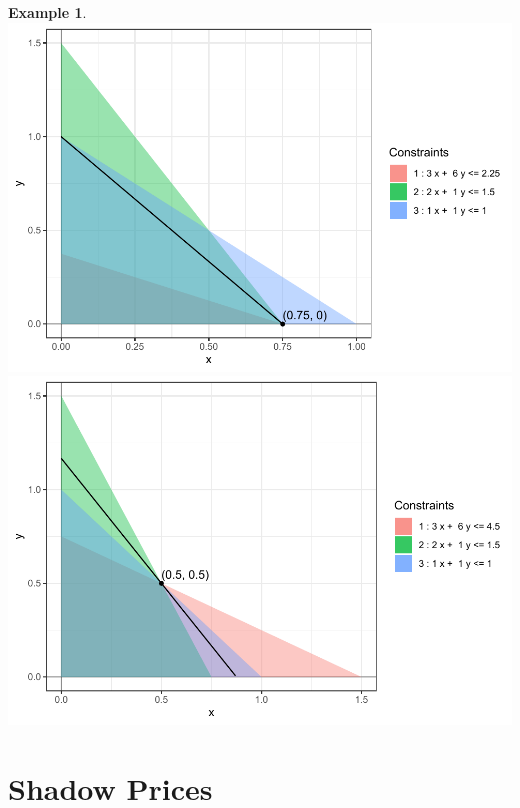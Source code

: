 \documentclass[
]{book}
\theoremstyle{definition}
\theoremstyle{definition}
\newtheorem{example}{Example}[chapter]
\theoremstyle{definition}
\theoremstyle{definition}
\theoremstyle{remark}
\begin{document}
\begin{example}
\includegraphics{Introduction-to-Optimization_files/figure-latex/fig-bounds-b1-1.pdf} \includegraphics{Introduction-to-Optimization_files/figure-latex/fig-bounds-b1-2.pdf}
\end{example}

\hypertarget{shadow-prices}{%
\section{Shadow Prices}\label{shadow-prices}}
\end{document}
